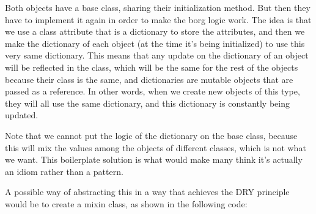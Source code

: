 \documentclass[a4paper,10pt,english]{sphinxmanual}
\begin{document}
\begin{sphinxVerbatim}[commandchars=\\\{\}]
     
         
         
\end{sphinxVerbatim}

Both objects have a base class, sharing their initialization method. But then they have to
implement it again in order to make the borg logic work. The idea is that we use a class
attribute that is a dictionary to store the attributes, and then we make the dictionary of each
object (at the time it’s being initialized) to use this very same dictionary. This means that
any update on the dictionary of an object will be reflected in the class, which will be the
same for the rest of the objects because their class is the same, and dictionaries are mutable
objects that are passed as a reference. In other words, when we create new objects of this
type, they will all use the same dictionary, and this dictionary is constantly being updated.

Note that we cannot put the logic of the dictionary on the base class, because this will mix
the values among the objects of different classes, which is not what we want. This
boilerplate solution is what would make many think it’s actually an idiom rather than a
pattern.

A possible way of abstracting this in a way that achieves the DRY principle would be to
create a mixin class, as shown in the following code:
\end{document}
